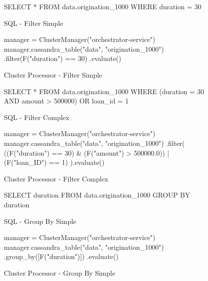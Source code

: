 \begin{figure}[htp]
	\centering
	\begin{SQL}
SELECT *
FROM data.origination_1000
WHERE duration = 30
	\end{SQL}
	\caption{SQL - Filter Simple}
	\label{fig:sql-filter-simple}
\end{figure}

\begin{figure}[htp]	
	\begin{python}
manager = ClusterManager("orchestrator-service")
manager.cassandra_table("data", "origination_1000")
.filter(F("duration") == 30)
.evaluate()
	\end{python}
	\caption{Cluster Processor - Filter Simple}
	\label{fig:cluster-filter-simple}
\end{figure}

\begin{figure}[htp]
	\centering
	\begin{SQL}
SELECT *
FROM data.origination_1000
WHERE 
(duration = 30 AND amount > 500000)
OR loan_id = 1
	\end{SQL}
	\caption{SQL - Filter Complex}
	\label{fig:sql-filter-complex}
\end{figure}
	
\begin{figure}[htp]
	\begin{python}
manager = ClusterManager("orchestrator-service")
manager.cassandra_table("data", "origination_1000")
.filter(
((F("duration") == 30) & (F("amount") > 500000.0))
| (F("loan_ID") == 1)
).evaluate()
	\end{python}
	\caption{Cluster Processor - Filter Complex}
	\label{fig:cluster-filter-complex}
\end{figure}

\begin{figure}[htp]
	\centering
	\begin{SQL}
		SELECT duration
		FROM data.origination_1000
		GROUP BY duration
	\end{SQL}
	\caption{SQL - Group By Simple}
	\label{fig:sql-group-by-simple}
\end{figure}

\begin{figure}[htp]
	\begin{python}
manager = ClusterManager("orchestrator-service")
manager.cassandra_table("data", "origination_1000")
.group_by([F("duration")])
.evaluate()
	\end{python}
	\caption{Cluster Processor - Group By Simple}
	\label{fig:cluster-group-by-simple}
\end{figure}

